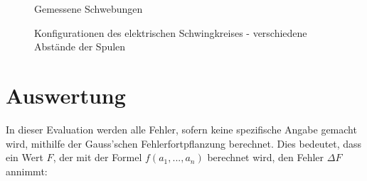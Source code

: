 \documentclass{article}
\begin{document}
\begin{figure}[p]
  \hfill
  \hfill
  \hfill
  \hfill
  \caption{Gemessene Schwebungen}
  \label{fig:beatMess}
\end{figure}

\begin{figure}[p]
  \centering
  \hfill
  \hfill
  \hfill
  \caption{Konfigurationen des elektrischen Schwingkreises - verschiedene Abstände der Spulen}
  \label{fig:elSchw}
\end{figure}

\clearpage
\newpage
\section{Auswertung}

In dieser Evaluation werden alle Fehler, sofern keine spezifische Angabe gemacht wird, mithilfe der Gauss'schen Fehlerfortpflanzung berechnet. Dies bedeutet, dass ein Wert $F$, der mit der Formel $f(a_1, ..., a_n)$ berechnet wird, den Fehler $\Delta F$ annimmt:
\end{document}
